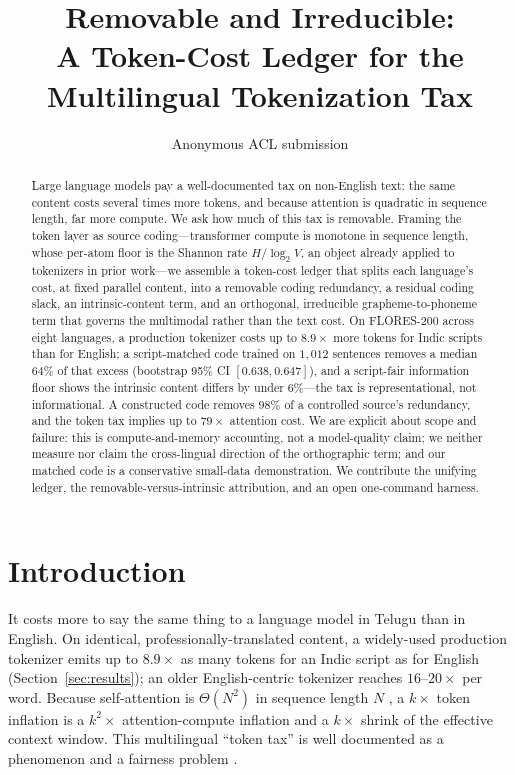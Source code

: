 \documentclass[11pt]{article}
\title{Removable and Irreducible:\\ A Token-Cost Ledger for the Multilingual Tokenization Tax}
\author{Anonymous ACL submission}
\begin{document}
\maketitle

\begin{abstract}
Large language models pay a well-documented tax on non-English text: the same content costs several
times more tokens, and because attention is quadratic in sequence length, far more compute. We ask how
much of this tax is removable. Framing the token layer as source coding---transformer compute is
monotone in sequence length, whose per-atom floor is the Shannon rate $H/\log_2 V$, an object already
applied to tokenizers in prior work---we assemble a token-cost ledger that splits each language's cost,
at fixed parallel content, into a removable coding redundancy, a residual coding slack, an
intrinsic-content term, and an orthogonal, irreducible grapheme-to-phoneme term that governs the
multimodal rather than the text cost. On FLORES-200 across eight languages, a production tokenizer costs
up to $8.9\times$ more tokens for Indic scripts than for English; a script-matched code trained on
$1{,}012$ sentences removes a median $64\%$ of that excess (bootstrap 95\% CI $[0.638, 0.647]$), and a
script-fair information floor shows the intrinsic content differs by under $6\%$---the tax is
representational, not informational. A constructed code removes $98\%$ of a controlled source's
redundancy, and the token tax implies up to $79\times$ attention cost. We are explicit about scope and
failure: this is compute-and-memory accounting, not a model-quality claim; we neither measure nor claim
the cross-lingual direction of the orthographic term; and our matched code is a conservative small-data
demonstration. We contribute the unifying ledger, the removable-versus-intrinsic attribution, and an
open one-command harness.
\end{abstract}

\section{Introduction}
It costs more to say the same thing to a language model in Telugu than in English. On identical,
professionally-translated content, a widely-used production tokenizer emits up to $8.9\times$ as many
tokens for an Indic script as for English (Section~\ref{sec:results}); an older English-centric
tokenizer reaches $16$--$20\times$ per word. Because self-attention is $\Theta(N^2)$ in sequence
length $N$ \citep{vaswani2017attention}, a $k\times$ token inflation is a $k^2\times$ attention-compute
inflation and a $k\times$ shrink of the effective context window. This multilingual ``token tax'' is
well documented as a phenomenon and a fairness problem \citep{ahia2023allcost, petrov2023unfairness,
lundin2025tokentax}.
\end{document}
